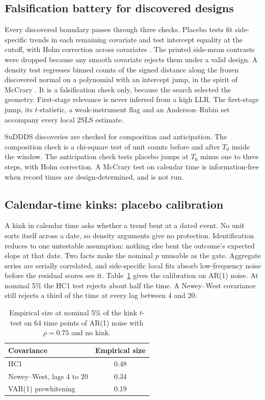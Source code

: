 \documentclass[11pt]{article}
\begin{document}
\subsection{Falsification battery for discovered designs}\label{sec:battery}

Every discovered boundary passes through three checks. Placebo tests fit side-specific
trends in each remaining covariate and test intercept equality at the cutoff, with Holm
correction across covariates \cite{holm1979}. The printed side-mean contrasts were
dropped because any smooth covariate rejects them under a valid design. A density test regresses binned counts of the signed distance along the frozen discovered
normal on a polynomial with an intercept jump, in the spirit of McCrary
\cite{mccrary2008}. It is a falsification check only, because the search selected the
geometry. First-stage relevance is never inferred from a high LLR. The first-stage jump,
its $t$-statistic, a weak-instrument flag and an Anderson--Rubin set
\cite{anderson1949,fieller1954} accompany every local 2SLS estimate.

SuDDDS discoveries are checked for composition and anticipation. The composition check is
a chi-square test of unit counts before and after $T_0$ inside the window. The
anticipation check tests placebo jumps at $T_0$ minus one to three steps, with Holm
correction. A McCrary test on calendar time is
information-free when record times are design-determined, and is not run.

\subsection{Calendar-time kinks: placebo calibration}\label{sec:placebo}

A kink in calendar time asks whether a trend bent at a dated event. No unit sorts
itself across a date, so density arguments give no protection. Identification reduces to
one untestable assumption: nothing else bent the outcome's expected slope at that date.
Two facts make the nominal $p$ unusable as the gate. Aggregate series are serially
correlated, and side-specific local fits absorb low-frequency noise before the residual
scores see it. Table~\ref{tab:ar1} gives the calibration on AR(1) noise. At nominal 5\% the HC1 test
rejects about half the time. A Newey--West covariance still rejects a third of the time at
every lag between 4 and 20.

\begin{table}[t]
\centering
\small
\caption{Empirical size at nominal 5\% of the kink $t$-test on 64 time points of AR(1)
noise with $\rho = 0.75$ and no kink.}
\label{tab:ar1}
\begin{tabular}{@{}lc@{}}
\toprule
Covariance & Empirical size \\
\midrule
HC1 & 0.48 \\
Newey--West, lags 4 to 20 & 0.34 \\
VAR(1) prewhitening & 0.19 \\
\bottomrule
\end{tabular}
\end{table}
\end{document}
